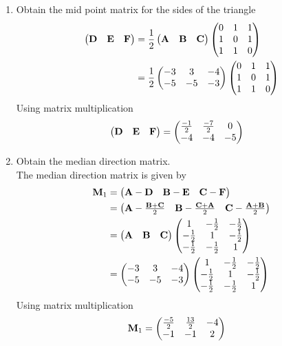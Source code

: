 \documentclass[11pt]{book}
\begin{document}
\begin{enumerate}[label=\thesubsection.\arabic*.,ref=\thesubsection.\theenumi]
\item Obtain the mid point matrix for the sides of the triangle \\
\solution
\begin{align}
\begin{pmatrix}\mathbf{D} & \mathbf{E} &\mathbf{F}\end{pmatrix} &= \frac{1}{2}\begin{pmatrix}\mathbf{A} & \mathbf{B} &\mathbf{C}\end{pmatrix}
\begin{pmatrix}0 & 1 & 1 \\ 1 & 0 & 1 \\ 1 & 1 & 0\end{pmatrix} \\
&= \frac{1}{2}\begin{pmatrix}-3 & 3 & -4 \\ -5 & -5 & -3\end{pmatrix}\begin{pmatrix}0 & 1 & 1 \\ 1 & 0 & 1 \\ 1 & 1 & 0\end{pmatrix}
\end{align}
Using matrix multiplication 
\begin{align}
    \begin{pmatrix}\mathbf{D} & \mathbf{E} &\mathbf{F}\end{pmatrix} &= \begin{pmatrix}\frac{-1}{2} & \frac{-7}{2} & 0 \\ -4 & -4 & -5\end{pmatrix}
\end{align}
\item Obtain the median direction matrix. \\
\solution The median direction matrix is given by 
\begin{align}
			\mathbf{M}_1 &= \begin{pmatrix}\mathbf{A}-\mathbf{D} & \mathbf{B}-\mathbf{E} & \mathbf{C}-\mathbf{F}\end{pmatrix}
			\\
			&= 
			  \begin{pmatrix}
				  \mathbf{A}-\frac{\mathbf{B}+\mathbf{C}}{2} &
			  \mathbf{B}-\frac{\mathbf{C}+\mathbf{A}}{2} &
			  \mathbf{C}-\frac{\mathbf{A}+\mathbf{B}}{2}\end{pmatrix} 
			  \\
			  &= \begin{pmatrix}\mathbf{A} & \mathbf{B} &\mathbf{C}\end{pmatrix}
			  \begin{pmatrix}
				  1 & -\frac{1}{2} & -\frac{1}{2}
				  \\
				  -\frac{1}{2} & 1 & -\frac{1}{2}
				  \\
				  -\frac{1}{2} & -\frac{1}{2} & 1
				  \end{pmatrix} 
      \\
      &= \begin{pmatrix}-3 & 3 & -4 \\ -5 & -5 & -3\end{pmatrix}\begin{pmatrix}
				  1 & -\frac{1}{2} & -\frac{1}{2}
				  \\
				  -\frac{1}{2} & 1 & -\frac{1}{2}
				  \\
				  -\frac{1}{2} & -\frac{1}{2} & 1
				  \end{pmatrix} 
		\end{align}
  Using matrix multiplication 
  \begin{align}
   \vec{M}_1 &=   \myvec{\frac{-5}{2} & \frac{13}{2} & -4 \\ -1 & -1 & 2}

\end{align}
\end{enumerate}
\end{document}
